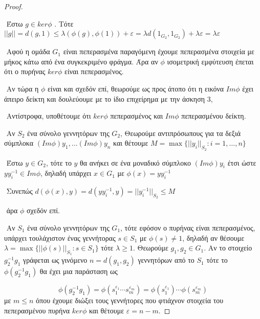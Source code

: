 \documentclass[oneside,a4paper]{article}
\begin{document}
\begin{proof} $ $


$ $\newline
Έστω $g \in ker\phi$ . Τότε $||g|| =d(g,1) \leq \lambda(\phi(g),\phi(1)) + \varepsilon  = \lambda d(1_{G_2},1_{G_2}) + \lambda \varepsilon = \lambda\varepsilon$

$ $\newline
Αφού η ομάδα $G_1$ είναι πεπερασμένα παραγόμενη έχουμε πεπερασμένα στοιχεία με μήκος κάτω από ένα συγκεκριμένο φράγμα. Άρα αν $\phi$ ισομετρική εμφύτευση έπεται ότι ο πυρήνας $ker\phi$ είναι πεπερασμένος.

$ $\newline
Αν τώρα η $\phi$ είναι και σχεδόν επί, θεωρούμε ως προς άτοπο ότι η εικόνα $Im\phi$ έχει άπειρο δείκτη και δουλεύουμε με το ίδιο επιχείρημα με την άσκηση 3, 


$ $\newline
Αντίστροφα, υποθέτουμε ότι $ker\phi$ πεπερασμένος και $Im\phi$ πεπερασμένου δείκτη.


$ $\newline
Αν $S_2$ ένα σύνολο γεννητόρων της $G_2$, Θεωρούμε αντιπρόσωπους για τα δεξιά σύμπλοκα $(Im\phi) y_1 ,\ldots (Im\phi) y_n$ και θέτουμε $M = \max \{ ||y_i||_{S_2}: i=1,\ldots,n \}$

$ $\newline
Έστω $y \in G_2$, τότε το $y$ θα ανήκει σε ένα μοναδικό σύμπλοκο $(Im\phi) y_i$ έτσι ώστε $y y^{-1}_i \in Im\phi$, δηλαδή υπάρχει $x \in G_1$ με $\phi(x) = yy^{-1}_i$

$ $\newline
Συνεπώς $d(\phi(x),y) = d(yy^{-1}_i,y) = ||y^{-1}_i||_{S_2} \leq M$

$ $\newline
άρα $\phi$ σχεδόν επί.

$ $\newline
Αν $S_1$ ένα σύνολο γεννητόρων της $G_1$, τότε εφόσον ο πυρήνας είναι πεπερασμένος, υπάρχει τουλάχιστον ένας γεννήτορας $s \in S_1$ με $\phi(s) \neq 1$, δηλαδή αν θέσουμε $\lambda = \max \{ ||\phi(s)||_{S_1} : s \in S_1 \}$ τότε $\lambda \geq 1$.  Θεωρούμε $g_1, g_2 \in G_1$. Αν το στοιχείο $g^{-1}_2 g_1$ γράφεται ως γινόμενο $n = d(g_1,g_2)$ γεννητόρων από το $S_1$ τότε το $\phi(g^{-1}_2 g_1)$ θα έχει μια παράσταση ως 

$$\phi(g^{-1}_2 g_1) = \phi (s^{\varepsilon_1}_1 \cdots s^{\varepsilon_{m}}_m) = \phi (s^{\varepsilon_1}_1) \cdots \phi (s^{\varepsilon_{m}}_m)$$
με $m\leq n$ όπου έχουμε διώξει τους γεννήτορες που φτιάχνον στοιχεία του πεπερασμένου πυρήνα $ker\phi$ και θέτουμε $\varepsilon = n-m$.


\end{proof}
\end{document}
